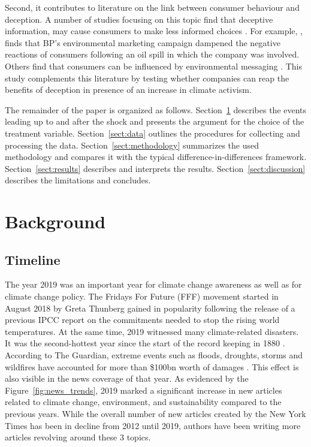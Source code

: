 \documentclass[12pt]{article}
\begin{document}
Second, it contributes to literature on the link between consumer behaviour and deception. A number of studies focusing on this topic find that deceptive information, may cause consumers to make less informed choices \parencite{raoDemandHealthyProducts2017,bronnenbergPharmacistsBuyBayer2015}. For example, \textcite{barrageAdvertisingEnvironmentalStewardship2020}, finds that BP's environmental marketing campaign dampened the negative reactions of consumers following an oil spill in which the company was involved. Others find that consumers can be influenced by environmental messaging \parencite{parguelCanEvokingNature2015,schmuckMisleadingConsumersGreen2018,nyilasyPerceivedGreenwashingInteractive2014}. This study complements this literature by testing whether companies can reap the benefits of deception in presence of an increase in climate activism.

The remainder of the paper is organized as follows. Section~\ref{sect:background} describes the events leading up to and after the shock and presents the argument for the choice of the treatment variable. Section~\ref{sect:data} outlines the procedures for collecting and processing the data. Section~\ref{sect:methodology} summarizes the used methodology and compares it with the typical difference-in-differences framework. Section~\ref{sect:results} describes and interprets the results. Section~\ref{sect:discussion} describes the limitations and concludes.

\section{Background}\label{sect:background}

\subsection{Timeline} 

The year 2019 was an important year for climate change awareness as well as for climate change policy. The Fridays For Future (FFF) movement started in August 2018 by Greta Thunberg gained in popularity following the release of a previous IPCC report on the commitments needed to stop the rising world temperatures. At the same time, 2019 witnessed many climate-related disasters. It was the second-hottest year since the start of the record keeping in 1880 \parencite{noaa2019global}. According to The Guardian, extreme events such as floods, droughts, storms and wildfires have accounted for more than \$100bn worth of damages \parencite{harvey2019climate}. This effect is also visible in the news coverage of that year. As evidenced by the Figure~\ref{fig:news_trends}, 2019 marked a significant increase in new articles related to climate change, environment, and sustainability compared to the previous years. While the overall number of new articles created by the New York Times has been in decline from 2012 until 2019, authors have been writing more articles revolving around these 3 topics.
\end{document}
